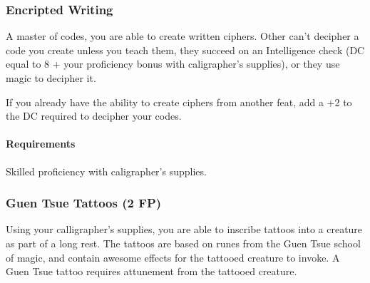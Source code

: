     \subsubsection{Encripted Writing} \label{feat::encriptedwriting}
        A master of codes, you are able to create written ciphers.
        Other can't decipher a code you create unless you teach them, they succeed on an Intelligence check (DC equal to 8 + your proficiency bonus with caligrapher's supplies), or they use magic to decipher it.

        If you already have the ability to create ciphers from another feat, add a +2 to the DC required to decipher your codes.
        \paragraph{Requirements} Skilled proficiency with caligrapher's supplies.
    \subsubsection{Guen Tsue Tattoos (2 FP)} \label{feat::guentsuetattoos}
        Using your calligrapher's supplies, you are able to inscribe tattoos into a creature as part of a long rest.
        The tattoos are based on runes from the Guen Tsue school of magic, and contain awesome effects for the tattooed creature to invoke.
        A Guen Tsue tattoo requires attunement from the tattooed creature.

